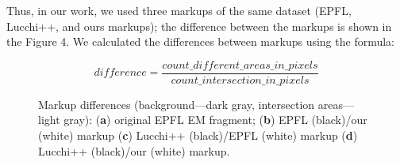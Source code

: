 \documentclass[journal,article,submit,pdftex,moreauthors]{Definitions/mdpi}
\begin{document}
Thus, in our work, we used three markups of the same dataset (EPFL, Lucchi++, and ours markups); the difference between the markups is shown in the Figure 4. We calculated the differences between markups using the formula:

\begin{equation}
	difference = \frac{\textit{count\_different\_areas\_in\_pixels}}{\textit{count\_intersection\_in\_pixels}}
\end{equation}

\begin{figure}[H]
	\hspace{0.1cm}
	\hspace{0.1cm}
	\hspace{0.1cm}
	\caption{Markup differences (background—dark gray, intersection areas—light gray): (\textbf{a}) original EPFL EM fragment; (\textbf{b}) EPFL (black)/our (white) markup (\textbf{c}) Lucchi++ (black)/EPFL (white) markup (\textbf{d}) Lucchi++ (black)/our (white) markup.\label{fig4}}
\end{figure}
\end{document}
